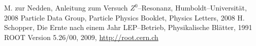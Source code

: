 \renewcommand{\refname}{Literatur und Programme}
\begin{thebibliography}{xxxxxx}
M. zur Nedden, Anleitung zum Versuch $Z^0$–Resonanz, Humboldt–Universität, 2008
Particle Data Group, Particle Physics Booklet, Physics Letters, 2008
H. Schopper, Die Ernte nach einem Jahr LEP–Betrieb, Physikalische Blätter, 1991
ROOT Version 5.26/00, 2009, \href{http://root.cern.ch}{http://root.cern.ch}
\end{thebibliography}